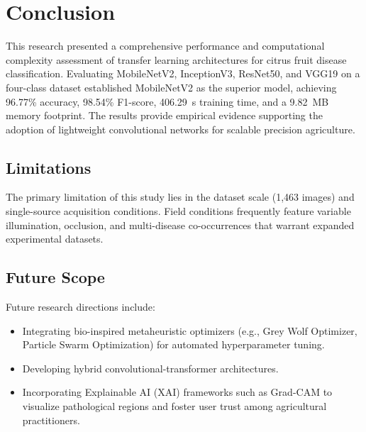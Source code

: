 \documentclass{ijcaArticle}
\begin{document}
\section{Conclusion}
\label{sec:conclusion}

This research presented a comprehensive performance and computational complexity assessment of transfer learning architectures for citrus fruit disease classification. Evaluating MobileNetV2, InceptionV3, ResNet50, and VGG19 on a four-class dataset established MobileNetV2 as the superior model, achieving 96.77\% accuracy, 98.54\% F1-score, 406.29~s training time, and a 9.82~MB memory footprint. The results provide empirical evidence supporting the adoption of lightweight convolutional networks for scalable precision agriculture.

\subsection{Limitations}
The primary limitation of this study lies in the dataset scale (1,463 images) and single-source acquisition conditions. Field conditions frequently feature variable illumination, occlusion, and multi-disease co-occurrences that warrant expanded experimental datasets.

\subsection{Future Scope}
Future research directions include:
\begin{itemize}
    \item Integrating bio-inspired metaheuristic optimizers (e.g., Grey Wolf Optimizer, Particle Swarm Optimization) for automated hyperparameter tuning.
    \item Developing hybrid convolutional-transformer architectures.
    \item Incorporating Explainable AI (XAI) frameworks such as Grad-CAM to visualize pathological regions and foster user trust among agricultural practitioners.
\end{itemize}



\end{document}
